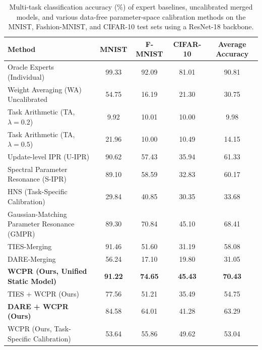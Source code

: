 \documentclass{article}
\theoremstyle{plain}
\theoremstyle{definition}
\theoremstyle{remark}
\begin{document}
\begin{table}[t]
  \caption{Multi-task classification accuracy (\%) of expert baselines, uncalibrated merged models, and various data-free parameter-space calibration methods on the MNIST, Fashion-MNIST, and CIFAR-10 test sets using a ResNet-18 backbone.}
  \label{tab:results}
  \vskip 0.15in
  \begin{center}
    \begin{small}
      \begin{sc}
        \begin{tabular}{lcccc}
          \toprule
          Method & MNIST & F-MNIST & CIFAR-10 & Average Accuracy \\
          \midrule
          Oracle Experts (Individual) & 99.33 & 92.09 & 81.01 & 90.81 \\
          \midrule
          Weight Averaging (WA) Uncalibrated & 54.75 & 16.19 & 21.30 & 30.75 \\
          Task Arithmetic (TA, $\lambda = 0.2$) & 9.92 & 10.01 & 10.00 & 9.98 \\
          Task Arithmetic (TA, $\lambda = 0.5$) & 21.96 & 10.00 & 10.49 & 14.15 \\
          Update-level IPR (U-IPR) & 90.62 & 57.43 & 35.94 & 61.33 \\
          Spectral Parameter Resonance (S-IPR) & 89.10 & 58.59 & 32.83 & 60.17 \\
          HNS (Task-Specific Calibration) & 29.84 & 40.85 & 30.35 & 33.68 \\
          Gaussian-Matching Parameter Resonance (GMPR) & 89.30 & 70.84 & 45.10 & 68.41 \\
          TIES-Merging \citep{yadav2023ties} & 91.46 & 51.60 & 31.19 & 58.08 \\
          DARE-Merging \citep{jin2023dataless} & 56.24 & 17.10 & 19.80 & 31.05 \\
          \midrule
          \textbf{WCPR (Ours, Unified Static Model)} & \textbf{91.22} & \textbf{74.65} & \textbf{45.43} & \textbf{70.43} \\
          TIES + WCPR (Ours) & 77.56 & 51.21 & 35.49 & 54.75 \\
          \textbf{DARE + WCPR (Ours)} & 84.58 & 64.01 & 41.28 & 63.29 \\
          WCPR (Ours, Task-Specific Calibration) & 53.64 & 55.86 & 49.62 & 53.04 \\
          \bottomrule
        \end{tabular}
      \end{sc}
    \end{small}
  \end{center}
  \vskip -0.1in
\end{table}
\end{document}
